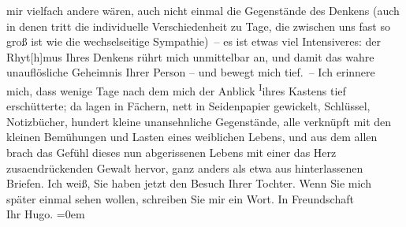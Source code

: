 \begin{ledgroupsized}[t]{13cm}
               mir vielfach andere wären, auch nicht einmal die Gegenstände des Denkens (auch in
               denen tritt die individuelle Verschiedenheit zu Tage, die zwischen uns fast so groß
               ist wie die wechselseitige Sympathie) – {\pb}es ist etwas viel Intensiveres:
               der Rhyt{[}h{]}mus Ihres Denkens rührt mich unmittelbar an, und damit
               das wahre unauflösliche Geheimnis Ihrer Person – und bewegt mich tief. – Ich erinnere
               mich, dass wenige Tage nach dem \label{K_L02496_1v}\label{K_L02496_1h} mich der Anblick \substVorne{}\textsuperscript{I}\substDazwischen{}i\substHinten{}hres Kastens tief erschütterte; da lagen in Fächern, nett in Seidenpapier
               gewickelt, Schlüssel, Notizbücher, hundert kleine unansehnliche Gegenstände, alle
               verknüpft mit den kleinen Bemühungen und Lasten eines weiblichen Lebens, und aus dem
               allen brach das Gefühl dieses nun abgerissenen Lebens mit einer das Herz zusa{\geminationm}endrückenden Gewalt hervor, ganz anders als etwa aus
               hinterlassenen Briefen.\pend
           \pstart
           Ich weiß, Sie haben jetzt den Besuch Ihrer Tochter. Wenn Sie mich später einmal sehen wollen,
               schreiben Sie mir ein Wort.\pend
           \pstart
           In Freundschaft{\\[\baselineskip]}Ihr \spacefill\mbox{Hugo.}\pend
           \leftskip=0em{}
         
         \endnumbering{}\end{ledgroupsized}  \newcommand{\dateiname}{L02496}\newcommand{\titel}{Hugo Hofmannsthal an Arthur Schnitzler, 29. 12. 1927}\newcommand{\editorInnen}{Martin Anton Müller und Gerd-Hermann Susen}
      